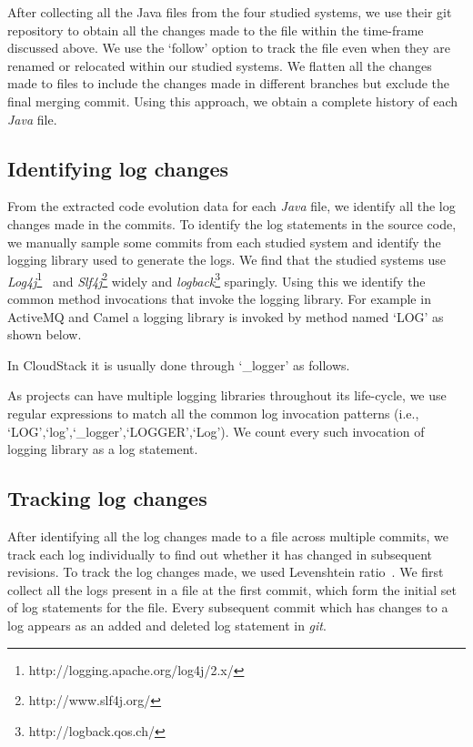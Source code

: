  After collecting all the Java files from the four studied systems, we use their git repository to obtain all the changes made to the file within the time-frame discussed above. We use the `follow' option to track the file even when they are renamed or relocated within our studied systems. We flatten all the changes made to files to include the changes made in different branches but exclude the final merging commit. Using this approach, we obtain a complete history of each \emph{Java} file. 

\subsection{Identifying log changes}
From the extracted code evolution data for each \emph{Java} file, we identify all the log changes made in the commits. To identify the log statements in the source code, we manually sample some commits from each studied system and identify the logging library used to generate the logs. We find that the studied systems use \textsl{Log4j}\footnote{http://logging.apache.org/log4j/2.x/}~\cite{EMSEIAN} and \textsl{Slf4j}\footnote{http://www.slf4j.org/} widely and \textsl{logback}\footnote{http://logback.qos.ch/} sparingly. Using this we identify the common method invocations that invoke the logging library. For example in  ActiveMQ and Camel a logging library is invoked by method named `LOG' as shown below.

In CloudStack it is usually done through `\_logger' as follows.


As projects can have multiple logging libraries throughout its life-cycle, we use regular expressions to match all the common log invocation patterns (i.e., `LOG',`log',`\_logger',`LOGGER',`Log'). We count every such invocation of logging library as a log statement.


\subsection{Tracking log changes}
After identifying all the log changes made to a file across multiple commits, we track each log individually to find out whether it has changed in subsequent revisions. To track the log changes made, we used Levenshtein ratio~\cite{levenshteinratio}. We first collect all the logs present in a file at the first commit, which form the initial set of log statements for the file. Every subsequent commit which has changes to a log appears as an added and deleted log statement in \textsl{git}.  

